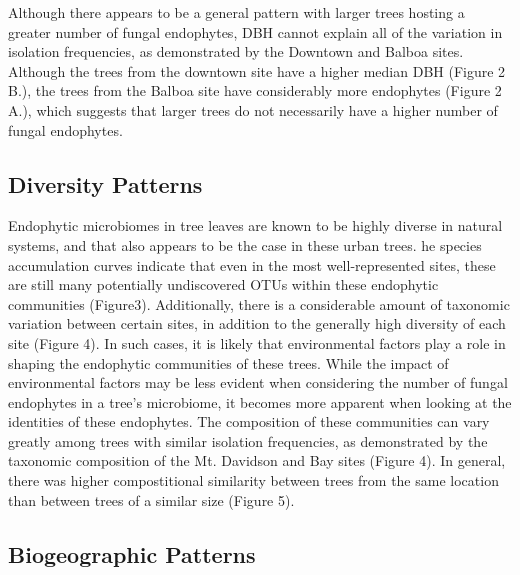 \documentclass[fleqn,10pt,lineno]{wlpeerj} %
\begin{document}
Although there appears to be a general pattern with larger trees hosting a greater number of fungal endophytes, DBH cannot explain all of the variation in isolation frequencies, as demonstrated by the Downtown and Balboa sites. Although the trees from the downtown site have a higher median DBH (Figure 2 B.), the trees from the Balboa site have considerably more endophytes (Figure 2 A.), which suggests that larger trees do not necessarily have a higher number of fungal endophytes.

\hypertarget{diversity-patterns-1}{%
\subsection*{Diversity Patterns}\label{diversity-patterns-1}}

Endophytic microbiomes in tree leaves are known to be highly diverse in natural systems, and that also appears to be the case in these urban trees. he species accumulation curves indicate that even in the most well-represented sites, these are still many potentially undiscovered OTUs within these endophytic communities (Figure3). Additionally, there is a considerable amount of taxonomic variation between certain sites, in addition to the generally high diversity of each site (Figure 4). In such cases, it is likely that environmental factors play a role in shaping the endophytic communities of these trees. While the impact of environmental factors may be less evident when considering the number of fungal endophytes in a tree's microbiome, it becomes more apparent when looking at the identities of these endophytes. The composition of these communities can vary greatly among trees with similar isolation frequencies, as demonstrated by the taxonomic composition of the Mt. Davidson and Bay sites (Figure 4). In general, there was higher compostitional similarity between trees from the same location than between trees of a similar size (Figure 5).

\hypertarget{biogeographic-patterns-1}{%
\subsection*{Biogeographic Patterns}\label{biogeographic-patterns-1}}
\end{document}
